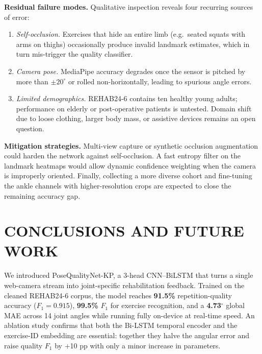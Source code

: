 \documentclass{article}
\begin{document}
\textbf{Residual failure modes.}  
Qualitative inspection reveals four recurring sources of error:
\begin{enumerate}[label=(\alph*),leftmargin=1.6em,itemsep=3pt]
  \item \emph{Self-occlusion.}  Exercises that hide an entire limb
        (e.g.\ seated squats with arms on thighs) occasionally produce
        invalid landmark estimates, which in turn mis-trigger the
        quality classifier.
  \item \emph{Camera pose.}  MediaPipe accuracy degrades once the sensor
        is pitched by more than \(\pm20^{\circ}\) or rolled
        non-horizontally, leading to spurious angle errors.
  \item \emph{Limited demographics.}  REHAB24-6 contains ten healthy
        young adults; performance on elderly or post-operative patients
        is untested.  Domain shift due to loose clothing, larger body
        mass, or assistive devices remains an open question.
\end{enumerate}

\textbf{Mitigation strategies.}  
Multi-view capture or synthetic occlusion augmentation could harden the
network against self-occlusion.  A fast entropy filter on the landmark
heatmaps would allow dynamic confidence weighting when the camera is
improperly oriented.  Finally, collecting a more diverse cohort and
fine-tuning the ankle channels with higher-resolution crops are expected
to close the remaining accuracy gap.

\section{CONCLUSIONS AND FUTURE WORK}
\label{sec:concl}
We introduced PoseQualityNet-KP, a 3-head CNN–BiLSTM that turns a single
web-camera stream into joint-specific rehabilitation feedback.  Trained
on the cleaned REHAB24-6 corpus, the model reaches
\textbf{91.5\%} repetition-quality accuracy
(\(F_{1}=0.915\)), \textbf{99.5\%} \(F_{1}\) for exercise recognition,
and a \textbf{4.73\(^{\circ}\)} global MAE across 14 joint angles while
running fully on-device at real-time speed.  An ablation study confirms
that both the Bi-LSTM temporal encoder and the exercise-ID embedding are
essential: together they halve the angular error and raise quality
\(F_{1}\) by +10 pp with only a minor increase in parameters.
\end{document}
